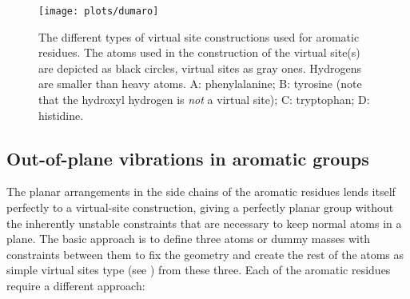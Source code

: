 \begin{figure}
\centerline{\texttt{[image: plots/dumaro]}}
\caption[Virtual site constructions for aromatic residues.]{The
different types of virtual site constructions used for aromatic
residues. The atoms used in the construction of the virtual site(s) are
depicted as black circles, virtual sites as gray ones. Hydrogens are
smaller than heavy atoms. {\sf A}: phenylalanine; {\sf B}: tyrosine
(note that the hydroxyl hydrogen is {\em not} a virtual site); {\sf C}:
tryptophan; {\sf D}: histidine.}
\label{fig:vistearo}
\end{figure}

\subsection{Out-of-plane vibrations in aromatic groups}
\label{sec:vsitearo}
The planar arrangements in the side chains of the aromatic residues
lends itself perfectly to a virtual-site construction, giving a
perfectly planar group without the inherently unstable constraints
that are necessary to keep normal atoms in a plane. The basic approach
is to define three atoms or dummy masses with constraints between them
to fix the geometry and create the rest of the atoms as simple virtual
sites type (see ) from these three. Each of
the aromatic residues require a different approach:

